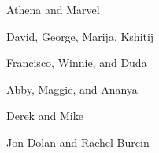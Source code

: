 
\setlength{\parskip}{1em}
\setlength{\parindent}{0em}

\noindent
Athena and Marvel

David, George, Marija, Kshitij

Francisco, Winnie, and Duda 

Abby, Maggie, and Ananya

Derek and Mike

Jon Dolan and Rachel Burcin
